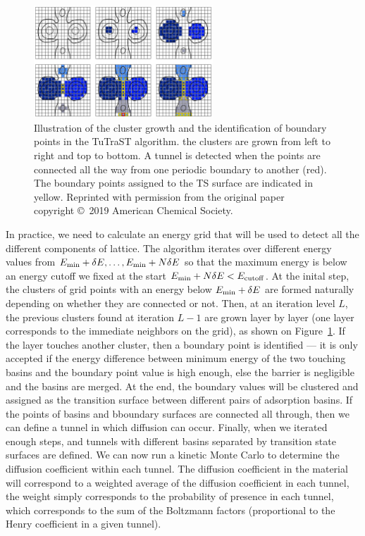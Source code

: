 \documentclass[main]{subfiles}
\begin{document}
\begin{figure}[ht]
  \centering
    \includegraphics[width=0.6\textwidth]{figures/5-diffusion/tutrast.jpg}
    \caption{ Illustration of the cluster growth and the identification of boundary points in the TuTraST algorithm\autocite{Mace_2019}. the clusters are grown from left to right and top to bottom. A tunnel is detected when the points are connected all the way from one periodic boundary to another (red). The boundary points assigned to the TS surface are indicated in yellow. Reprinted with permission from the original paper~\cite{Mace_2019} copyright \copyright\ 2019 American Chemical Society. }\label{fgr:tutrast}
\end{figure}

In practice, we need to calculate an energy grid that will be used to detect all the different components of lattice. The algorithm iterates over different energy values from $E_{\text{min}}+\delta E, \ldots, E_{\text{min}}+N\delta E$ so that the maximum energy is below an energy cutoff we fixed at the start $E_{\text{min}}+N\delta E<E_{\text{cutoff}}$. At the inital step, the clusters of grid points with an energy below $E_{\text{min}}+\delta E$ are formed naturally depending on whether they are connected or not. Then, at an iteration level $L$, the previous clusters found at iteration $L-1$ are grown layer by layer (one layer corresponds to the immediate neighbors on the grid), as shown on Figure~\ref{fgr:tutrast}. If the layer touches another cluster, then a boundary point is identified --- it is only accepted if the energy difference between minimum energy of the two touching basins and the boundary point value is high enough, else the barrier is negligible and the basins are merged. At the end, the boundary values will be clustered and assigned as the transition surface between different pairs of adsorption basins. If the points of basins and bboundary surfaces are connected all through, then we can define a tunnel in which diffusion can occur. Finally, when we iterated enough steps, and tunnels with different basins separated by transition state surfaces are defined. We can now run a kinetic Monte Carlo to determine the diffusion coefficient within each tunnel. The diffusion coefficient in the material will correspond to a weighted average of the diffusion coefficient in each tunnel, the weight simply corresponds to the probability of presence in each tunnel, which corresponds to the sum of the Boltzmann factors (proportional to the Henry coefficient in a given tunnel). 
\end{document}
